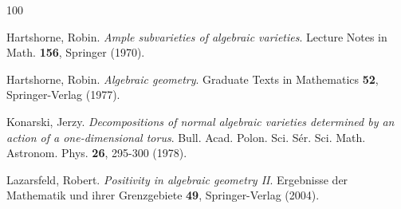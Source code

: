 \documentclass[11pt,reqno,a4paper]{amsart}
\theoremstyle{remark}
\begin{document}
\begin{thebibliography}{100}




 Hartshorne, Robin. {\it Ample subvarieties of algebraic varieties}. Lecture Notes in Math. \textbf{156}, Springer (1970).

 Hartshorne, Robin. {\it Algebraic geometry}. Graduate Texts in Mathematics \textbf{52}, Springer-Verlag (1977).





 Konarski, Jerzy. {\it Decompositions of normal algebraic varieties determined by an action of a one-dimensional torus}. Bull. Acad. Polon. Sci. Sér. Sci. Math. Astronom. Phys. \textbf{26}, 295-300 (1978).

 Lazarsfeld, Robert. {\it Positivity in algebraic geometry II}. Ergebnisse der Mathematik und ihrer Grenzgebiete \textbf{49}, Springer-Verlag (2004).




\end{thebibliography}
\end{document}
